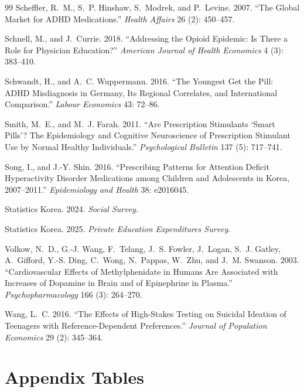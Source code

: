 \documentclass[12pt]{article}
\begin{document}
\begin{thebibliography}{99}
Scheffler, R.~M., S.~P. Hinshaw, S.~Modrek, and P.~Levine. 2007. ``The Global Market for ADHD Medications.'' \textit{Health Affairs} 26 (2): 450--457.

Schnell, M., and J.~Currie. 2018. ``Addressing the Opioid Epidemic: Is There a Role for Physician Education?'' \textit{American Journal of Health Economics} 4 (3): 383--410.

Schwandt, H., and A.~C. Wuppermann. 2016. ``The Youngest Get the Pill: ADHD Misdiagnosis in Germany, Its Regional Correlates, and International Comparison.'' \textit{Labour Economics} 43: 72--86.

Smith, M.~E., and M.~J. Farah. 2011. ``Are Prescription Stimulants `Smart Pills'? The Epidemiology and Cognitive Neuroscience of Prescription Stimulant Use by Normal Healthy Individuals.'' \textit{Psychological Bulletin} 137 (5): 717--741.

Song, I., and J.-Y. Shin. 2016. ``Prescribing Patterns for Attention Deficit Hyperactivity Disorder Medications among Children and Adolescents in Korea, 2007--2011.'' \textit{Epidemiology and Health} 38: e2016045.

Statistics Korea. 2024. \textit{Social Survey}.

Statistics Korea. 2025. \textit{Private Education Expenditures Survey}.

Volkow, N.~D., G.-J. Wang, F.~Telang, J.~S. Fowler, J.~Logan, S.~J. Gatley, A.~Gifford, Y.-S. Ding, C.~Wong, N.~Pappas, W.~Zhu, and J.~M. Swanson. 2003. ``Cardiovascular Effects of Methylphenidate in Humans Are Associated with Increases of Dopamine in Brain and of Epinephrine in Plasma.'' \textit{Psychopharmacology} 166 (3): 264--270.

Wang, L.~C. 2016. ``The Effects of High-Stakes Testing on Suicidal Ideation of Teenagers with Reference-Dependent Preferences.'' \textit{Journal of Population Economics} 29 (2): 345--364.

\end{thebibliography}

\clearpage
\section*{Appendix Tables}
\end{document}
